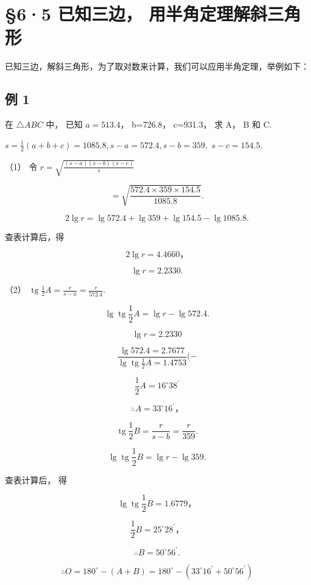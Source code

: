 \section{§6·5 已知三边， 用半角定理解斜三角形}

已知三边，解斜三角形，为了取对数来计算，我们可以应用半角定理，举例如下：

\subsection{例 1}

在 \(\triangle ABC\) 中， 已知 \(a=513.4\)， b=726.8， c=931.3， 求 A，
B 和 C.

\(s = \frac{1}{2} (a + b + c) = 1085.8, s - a = 572.4, s - b = 359,\)
\(s - c = 154.5.\)

（1） 令 \(r = \sqrt{\frac{(s - a)(s - b)(s - c)}{s}}\)

\[
= \sqrt {\frac {572.4 \times 359 \times 154.5}{1085.8}}.
\]

\[
2 \lg r = \lg 572.4 + \lg 359 + \lg 154.5 - \lg 1085.8.
\]

查表计算后，得

\[
2 \lg r = 4.4660\text{，}
\]

\[
\lg r = 2.2330.
\]

（2）
\(\operatorname{tg} \frac{1}{2} A = \frac{r}{s - a} = \frac{r}{572.4}\).

\[
\lg \operatorname{tg} \frac {1}{2} A = \lg r - \lg 572.4.
\]

\[
\lg r = 2.2330
\]

\[
\frac {\lg 572.4 = 2.7677}{\lg \operatorname{tg} \frac {1}{2} A = 1.4753} (-
\]

\[
\frac {1}{2} A = 16 ^{\circ} 38 ^{\prime}
\]

\[
\therefore A = 33 ^{\circ} 16 ^{\prime}\text{，}
\]

\[
\operatorname{tg} \frac {1}{2} B = \frac {r}{s - b} = \frac {r}{359}.
\]

\[
\lg \operatorname{tg} \frac {1}{2} B = \lg r - \lg 359.
\]

查表计算后， 得

\[
\lg \operatorname{tg} \frac {1}{2} B = \overline {{1.6779}}\text{，}
\]

\[
\frac {1}{2} B = 25 ^{\circ} 28 ^{\prime}\text{，}
\]

\[
\therefore B = 50 ^{\circ} 56 ^{\prime}.
\]

\[
\therefore O = 180 ^{\circ} - (A + B) = 180 ^{\circ} - (33 ^{\circ} 16 ^{\prime} + 50 ^{\circ} 56 ^{\prime})
\]

